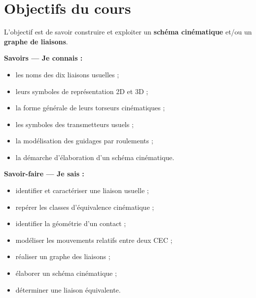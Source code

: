 \section*{Objectifs du cours}

\begin{tcolorbox}[
  enhanced,breakable,
  colback=white,colframe=TLCoverBlue,
  boxrule=.8pt,arc=2mm,
  title={Modéliser et analyser le comportement cinématique d'un mécanisme},
  colbacktitle=TLCoverBlue,coltitle=white,fonttitle=\bfseries
]
L'objectif est de savoir construire et exploiter un \textbf{schéma cinématique}
et/ou un \textbf{graphe de liaisons}.
\end{tcolorbox}

\begin{minipage}[t]{.48\linewidth}
\textbf{\large Savoirs — Je connais :}
\begin{itemize}
  \item les noms des dix liaisons usuelles ; \hfill\TLCheck
  \item leurs symboles de représentation 2D et 3D ; \hfill\TLCheck
  \item la forme générale de leurs torseurs cinématiques ; \hfill\TLCheck
  \item les symboles des transmetteurs usuels ; \hfill\TLCheck
  \item la modélisation des guidages par roulements ; \hfill\TLCheck
  \item la démarche d'élaboration d'un schéma cinématique. \hfill\TLCheck
\end{itemize}
\end{minipage}\hfill
\begin{minipage}[t]{.48\linewidth}
\textbf{\large Savoir-faire — Je sais :}
\begin{itemize}
  \item identifier et caractériser une liaison usuelle ; \hfill\TLCheck
  \item repérer les classes d'équivalence cinématique ; \hfill\TLCheck
  \item identifier la géométrie d'un contact ; \hfill\TLCheck
  \item modéliser les mouvements relatifs entre deux CEC ; \hfill\TLCheck
  \item réaliser un graphe des liaisons ; \hfill\TLCheck
  \item élaborer un schéma cinématique ; \hfill\TLCheck
  \item déterminer une liaison équivalente. \hfill\TLCheck
\end{itemize}
\end{minipage}

